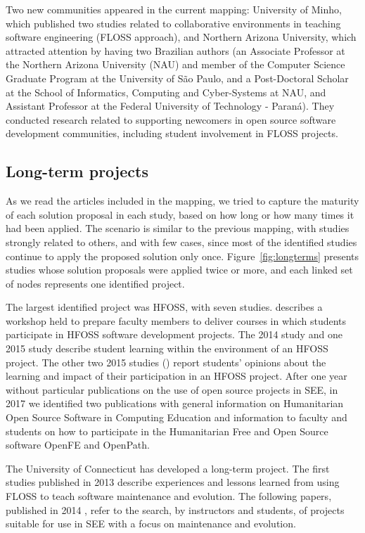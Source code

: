 Two new communities appeared in the current mapping: 
University of Minho, which published two studies related to collaborative environments in teaching software engineering (FLOSS approach), and Northern Arizona University, which attracted attention by having two Brazilian authors 
(an Associate Professor at the Northern Arizona University (NAU) and member of the Computer Science Graduate Program at the University of São Paulo, and a Post-Doctoral Scholar at the School of Informatics, Computing and Cyber-Systems at NAU, and Assistant Professor at the Federal University of Technology - Paraná). 
They conducted research related to supporting newcomers in open source software development communities, including student involvement in FLOSS projects.

\subsection{Long-term projects}

As we read the articles included in the mapping, we tried to capture the  maturity of each solution proposal in each study, based on how long or how many times it had been applied. 
The scenario is similar to the previous mapping, with studies strongly related to others, and with few cases, since most of the identified studies continue to apply the proposed solution only once. Figure~\ref{fig:longterms} presents studies whose solution proposals were applied twice or more, and each linked set of nodes represents one identified project. 

The largest identified project was HFOSS, with seven studies.  \citeauthor{id1193} describes a workshop held to prepare faculty members to deliver courses in which students participate in HFOSS software development projects. The 2014 study \cite{id5335} and one 2015 study \cite{id4966} describe student learning within the environment of an HFOSS project. The other two 2015 studies (\cite{id5147, id17830})
report students' opinions about the learning and impact of their participation in an HFOSS project. After one year without particular publications on the use of open source projects in SEE, in 2017 we identified two publications with general information on Humanitarian Open Source Software in Computing Education \cite{id1097,id18359} and information to faculty and students on how to participate in the Humanitarian Free and Open Source software OpenFE and OpenPath.

The University of Connecticut has developed a long-term project. The first studies published in 2013 \cite{id17800,id0135} describe experiences and lessons learned from using FLOSS to teach software maintenance and evolution. 
The following papers, published in 2014 \cite{id17796,id5357},
refer to the search, by instructors and students, of projects suitable for use in SEE with a focus on maintenance and evolution.

